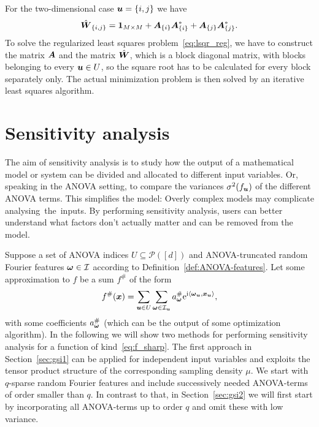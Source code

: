 \documentclass{article}
\renewcommand{\vec}[1]{\ensuremath \mathbf{\boldsymbol{#1}}}
\newcommand{\w}{\ensuremath{\vec \omega}}
\newcommand{\x}{\ensuremath{\vec x}}
\newcommand{\I}{\ensuremath{\mathcal{I}}}
\newcommand{\e}{\mathrm{e}}
\newcommand{\im}{\mathrm{i}}
\theoremstyle{definition}
\numberwithin{equation}{section}
\begin{document}
For the two-dimensional case $\vec u = \{i,j\}$ we have
$$\hat{\vec W}_{\{i,j\}} = \vec 1_{M\times M} + \vec A_{\{i\}}\vec A_{\{i\}}^* +\vec A_{\{j\}}\vec A_{\{j\}}^*.$$ 
To solve the regularized least squares problem~\eqref{eq:lsqr_reg}, we have to construct the matrix $\vec A$ and the matrix $\hat{\vec W}$, which is a block diagonal matrix, with blocks belonging to every $\vec u\in U$, so the square root has to be calculated for every block separately only. The actual minimization problem is then solved by an iterative least squares algorithm. 


\section{Sensitivity analysis}\label{sec:sensitivity}
The aim of sensitivity analysis is to study how the output of a mathematical model or system can be divided and allocated to different input variables. Or, speaking in the ANOVA setting, to compare the variances $\sigma^2(f_{\vec u}) $ of the different ANOVA terms. This simplifies the model: Overly complex models may complicate analysing the inputs. By performing sensitivity analysis, users can better understand what factors don't actually matter and can be removed from the model.\par

Suppose a set of ANOVA indices $U\subseteq \mathcal P([d])$ and ANOVA-truncated random Fourier features $\w\in \I$ according to Definition~\ref{def:ANOVA-features}. Let some approximation to $f$ be a sum $f^\#$ of the form
\begin{equation}\label{eq:f_sharp}
f^\#(\vec x)=\sum_{\vec u\in U}\sum_{\w\in \I_{\vec u}} a^\#_{\w} \e^{\im\langle\w_{\vec u},\x_{\vec u}\rangle },
\end{equation}
with some coefficients $a^\#_\w$ (which can be the output of some optimization algorithm). In the following we will show two methods for performing sensitivity analysis for a function of kind~\eqref{eq:f_sharp}. The first approach in Section~\ref{sec:gsi1} can be applied for independent input variables and exploits the tensor product structure of the corresponding sampling density $\mu$. We start with $q$-sparse random Fourier features and include successively needed ANOVA-terms of order smaller than $q$. In contrast to that, in Section~\ref{sec:gsi2} we will first start by incorporating all ANOVA-terms up to order $q$ and omit these with low variance.
\end{document}
